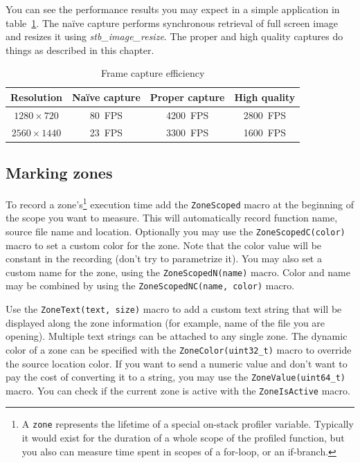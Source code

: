 \documentclass[hidelinks,titlepage,a4paper]{article}
\begin{document}
You can see the performance results you may expect in a simple application in table~\ref{asynccapture}. The na\"ive capture performs synchronous retrieval of full screen image and resizes it using \emph{stb\_image\_resize}. The proper and high quality captures do things as described in this chapter.

\begin{table}[h]
\centering
\begin{tabular}[h]{c|c|c|c}
\textbf{Resolution} & \textbf{Na\"ive capture} & \textbf{Proper capture} & \textbf{High quality} \\ \hline
$1280\times720$ & 80~FPS & 4200~FPS & 2800~FPS \\
$2560\times1440$ & 23~FPS & 3300~FPS & 1600~FPS
\end{tabular}
\caption{Frame capture efficiency}
\label{asynccapture}
\end{table}

\subsection{Marking zones}
\label{markingzones}

To record a zone's\footnote{A \texttt{zone} represents the lifetime of a special on-stack profiler variable. Typically it would exist for the duration of a whole scope of the profiled function, but you also can measure time spent in scopes of a for-loop, or an if-branch.} execution time add the \texttt{ZoneScoped} macro at the beginning of the scope you want to measure. This will automatically record function name, source file name and location. Optionally you may use the \texttt{ZoneScopedC(color)} macro to set a custom color for the zone. Note that the color value will be constant in the recording (don't try to parametrize it). You may also set a custom name for the zone, using the \texttt{ZoneScopedN(name)} macro. Color and name may be combined by using the \texttt{ZoneScopedNC(name, color)} macro.

Use the \texttt{ZoneText(text, size)} macro to add a custom text string that will be displayed along the zone information (for example, name of the file you are opening). Multiple text strings can be attached to any single zone. The dynamic color of a zone can be specified with the \texttt{ZoneColor(uint32\_t)} macro to override the source location color. If you want to send a numeric value and don't want to pay the cost of converting it to a string, you may use the \texttt{ZoneValue(uint64\_t)} macro. You can check if the current zone is active with the \texttt{ZoneIsActive} macro.
\end{document}
